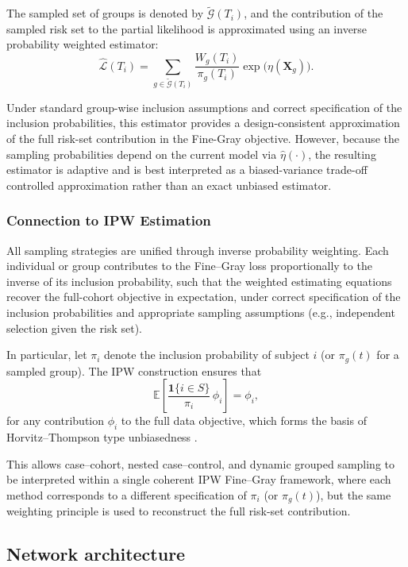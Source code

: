 \documentclass[a4paper,twoside,12pt]{report}
\begin{document}
The sampled set of groups is denoted by $\tilde{\mathcal{G}}(T_i)$, and the contribution of the sampled risk set to the partial likelihood is approximated using an inverse probability weighted estimator:
\[
\widehat{\mathcal{L}}(T_i)=\sum_{g \in \tilde{\mathcal{G}}(T_i)} \frac{W_g(T_i)}{\pi_g(T_i)} \exp\bigl(\eta(\boldsymbol{X}_g)\bigr).
\]

Under standard group-wise inclusion assumptions and correct specification of the inclusion probabilities, this estimator provides a design-consistent approximation of the full risk-set contribution in the Fine-Gray objective. However, because the sampling probabilities depend on the current model via $\hat{\eta}(\cdot)$, the resulting estimator is adaptive and is best interpreted as a biased-variance trade-off controlled approximation rather than an exact unbiased estimator.

\subsubsection{Connection to IPW Estimation}
All sampling strategies are unified through inverse probability weighting. Each individual or group contributes to the Fine–Gray loss proportionally to the inverse of its inclusion probability, such that the weighted estimating equations recover the full-cohort objective in expectation, under correct specification of the inclusion probabilities and appropriate sampling assumptions (e.g., independent selection given the risk set). 

In particular, let $\pi_i$ denote the inclusion probability of subject $i$ (or $\pi_g(t)$ for a sampled group). The IPW construction ensures that
\[
\mathbb{E}\!\left[\frac{\mathbf{1}\{i \in S\}}{\pi_i} \, \phi_i \right] = \phi_i,
\]
for any contribution $\phi_i$ to the full data objective, which forms the basis of Horvitz–Thompson type unbiasedness \citep{HorvitzThompson1952}. 

This allows case–cohort, nested case–control, and dynamic grouped sampling to be interpreted within a single coherent IPW Fine–Gray framework, where each method corresponds to a different specification of $\pi_i$ (or $\pi_g(t)$), but the same weighting principle is used to reconstruct the full risk-set contribution.


\subsection{Network architecture}
\end{document}
